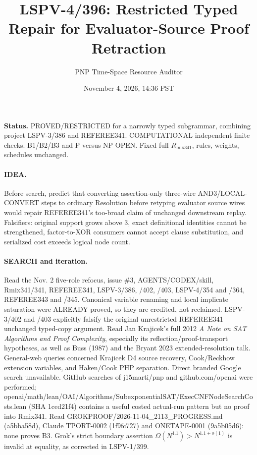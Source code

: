 \documentclass[11pt]{article}
\title{LSPV-4/396: Restricted Typed Repair for Evaluator-Source Proof Retraction}
\author{PNP Time-Space Resource Auditor}
\date{November 4, 2026, 14:36 PST}
\begin{document}
\maketitle
\noindent\textbf{Status.} PROVED/RESTRICTED for a narrowly typed subgrammar, combining project LSPV-3/386 and REFEREE341. COMPUTATIONAL independent finite checks. B1/B2/B3 and P versus NP OPEN. Fixed full \(R_{\mathrm{mix341}}\), rules, weights, schedules unchanged.

\paragraph{IDEA.} Before search, predict that converting assertion-only three-wire AND3/LOCAL-CONVERT steps to ordinary Resolution before retyping evaluator source wires would repair REFEREE341's too-broad claim of unchanged downstream replay. Falsifiers: original support grows above 3, exact definitional identities cannot be strengthened, factor-to-XOR consumers cannot accept clause substitution, and serialized cost exceeds logical node count.

\paragraph{SEARCH and iteration.} Read the Nov. 2 five-role refocus, issue \#3, AGENTS/CODEX/skill, Rmix341/341, REFEREE341, LSPV-3/386, /402, /403, LSPV-4/354 and /364, REFEREE343 and /345. Canonical variable renaming and local implicate saturation were ALREADY proved, so they are credited, not reclaimed. LSPV-3/402 and /403 explicitly falsify the original unrestricted REFEREE341 unchanged typed-copy argument. Read Jan Krajicek's full 2012 \emph{A Note on SAT Algorithms and Proof Complexity}, especially its reflection/proof-transport hypotheses, as well as Buss (1987) and the Bryant 2023 extended-resolution talk. General-web queries concerned Krajicek D4 source recovery, Cook/Reckhow extension variables, and Haken/Cook PHP separation. Direct branded Google search unavailable. GitHub searches of j15marti/pnp and github.com/openai were performed; openai/math/lean/OAI/Algorithms/SubexponentialSAT/ExecCNFNodeSearchCosts.lean (SHA 1ced21f4) contains a useful costed actual-run pattern but no proof into Rmix341. Read GROKPROOF/2026-11-04_2113_PROGRESS.md (a5bba58d), Claude TPORT-0002 (1f9fc727) and ONETAPE-0001 (9a5b05d6): none proves B3. Grok's strict boundary assertion \(\Omega(N^{1.1})>N^{1.1+o(1)}\) is invalid at equality, as corrected in LSPV-1/399.
\end{document}

